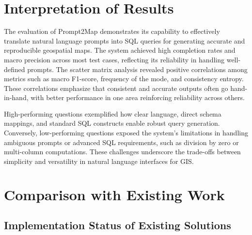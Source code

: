 



\section{Interpretation of Results}

The evaluation of Prompt2Map demonstrates its capability to effectively translate natural language prompts into SQL queries for generating accurate and reproducible geospatial maps. The system achieved high completion rates and macro precision across most test cases, reflecting its reliability in handling well-defined prompts. The scatter matrix analysis revealed positive correlations among metrics such as macro F1-score, frequency of the mode, and consistency entropy. These correlations emphasize that consistent and accurate outputs often go hand-in-hand, with better performance in one area reinforcing reliability across others.

High-performing questions exemplified how clear language, direct schema mappings, and standard SQL constructs enable robust query generation. Conversely, low-performing questions exposed the system's limitations in handling ambiguous prompts or advanced SQL requirements, such as division by zero or multi-column computations. These challenges underscore the trade-offs between simplicity and versatility in natural language interfaces for GIS.

\section{Comparison with Existing Work}

\subsection{Implementation Status of Existing Solutions}

